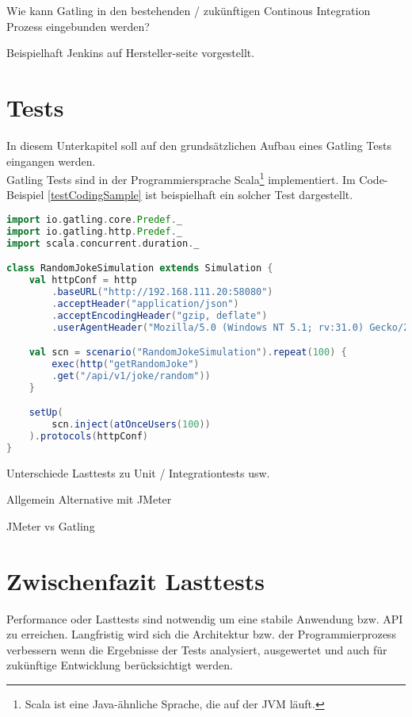 Wie kann Gatling in den bestehenden / zukünftigen Continous Integration Prozess eingebunden werden?

Beispielhaft Jenkins auf Hersteller-seite vorgestellt.


\section{Tests}
In diesem Unterkapitel soll auf den grundsätzlichen Aufbau eines Gatling Tests eingangen werden.\\
Gatling Tests sind in der Programmiersprache Scala\footnote{{} Scala ist eine Java-ähnliche Sprache, die auf der \ac{JVM} läuft.} implementiert.
Im Code-Beispiel \ref{testCodingSample} ist beispielhaft ein solcher Test dargestellt.

\begin{minipage}{\linewidth}
\begin{lstlisting}[frame=single,caption=Testabfrage auf Schnittstelle, label=testCodingSample, language=Scala]
import io.gatling.core.Predef._
import io.gatling.http.Predef._
import scala.concurrent.duration._

class RandomJokeSimulation extends Simulation {
    val httpConf = http
        .baseURL("http://192.168.111.20:58080")
        .acceptHeader("application/json")
        .acceptEncodingHeader("gzip, deflate")
        .userAgentHeader("Mozilla/5.0 (Windows NT 5.1; rv:31.0) Gecko/20100101 Firefox/31.0")

    val scn = scenario("RandomJokeSimulation").repeat(100) {
        exec(http("getRandomJoke")
        .get("/api/v1/joke/random"))
    }    

    setUp(
        scn.inject(atOnceUsers(100))
    ).protocols(httpConf)
}
\end{lstlisting}
\end{minipage}



Unterschiede Lasttests zu Unit / Integrationtests usw.



Allgemein Alternative mit JMeter

JMeter vs Gatling


\section{Zwischenfazit Lasttests}

Performance oder Lasttests sind notwendig um eine stabile Anwendung bzw. API zu erreichen.
Langfristig wird sich die Architektur bzw. der Programmierprozess verbessern wenn die Ergebnisse der Tests analysiert, ausgewertet und auch für zukünftige Entwicklung berücksichtigt werden.



